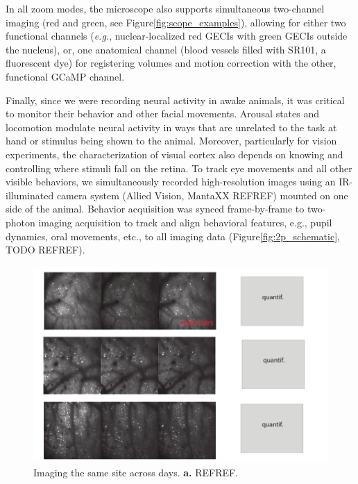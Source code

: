 In all zoom modes, the microscope also supports simultaneous two-channel imaging (red and green, see Figure\ref{fig:scope_examples}), allowing for either two functional channels (\textit{e.g.}, nuclear-localized red GECIs with green GECIs outside the nucleus), or, one anatomical channel (blood vessels filled with SR101, a fluorescent dye) for registering volumes and motion correction with the other, functional GCaMP channel. 

Finally, since we were recording neural activity in awake animals, it was critical to monitor their behavior and other facial movements. Arousal states and locomotion modulate neural activity in ways that are unrelated to the task at hand or stimulus being shown to the animal. Moreover, particularly for vision experiments, the characterization of visual cortex also depends on knowing and controlling where stimuli fall on the retina. To track eye movements and all other visible behaviors, we simultaneously recorded high-resolution images using an IR-illuminated camera system (Allied Vision, MantaXX REFREF) mounted on one side of the animal. Behavior acquisition was synced frame-by-frame to two-photon imaging acquisition to track and align behavioral features, e.g., pupil dynamics, oral movements, etc., to all imaging data (Figure\ref{fig:2p_schematic}, TODO REFREF).


\begin{figure}[t!]
    \includegraphics[width=\textwidth]{figures/chapter_2/fig_2-8_multiday_imaging/multiday_imaging.pdf}
    \vspace{.1in}
    \caption[Multi-day imaging]{Imaging the same site across days. \textbf{a.} REFREF.
    \label{fig:multiday_imaging}}
\end{figure}

